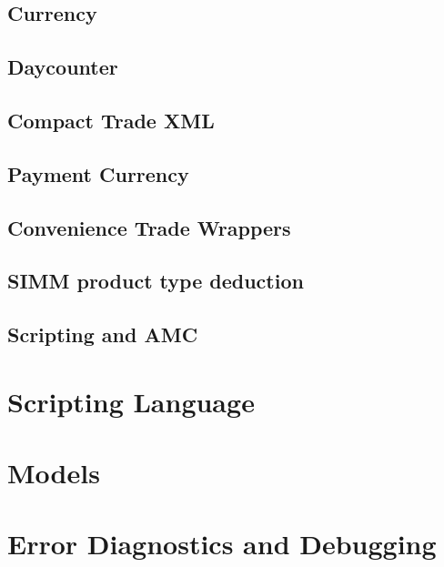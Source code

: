 \documentclass[12pt, a4paper]{article}
\begin{document}
\subsection{Currency}


\subsection{Daycounter}


\subsection{Compact Trade XML}\label{compactXml}


\subsection{Payment Currency}\label{sss:payccy_st}


\subsection{Convenience Trade Wrappers}


\subsection{SIMM product type deduction}


\subsection{Scripting and AMC}\label{scripting_amc}


\section{Scripting Language}


\section{Models}


\section{Error Diagnostics and Debugging}

\end{document}

